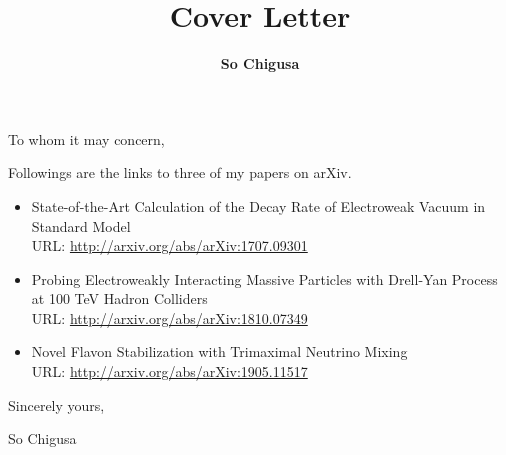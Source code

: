 \documentclass[12pt,notitlepage]{article}
\title{\vspace*{-3cm}Cover Letter}
\author{\textbf{So Chigusa}}
\date{}
\begin{document}
\thispagestyle{empty}

To whom it may concern,

\vspace{5mm}
Followings are the links to three of my papers on arXiv.
\begin{itemize}
  \setlength{\parskip}{1mm}
  \setlength{\itemsep}{0cm}
  \item
    State-of-the-Art Calculation of the Decay Rate of Electroweak Vacuum in Standard Model\\
    URL: \href{http://arxiv.org/abs/arXiv:1707.09301}{http://arxiv.org/abs/arXiv:1707.09301}

  \item
    Probing Electroweakly Interacting Massive Particles with Drell-Yan Process at 100 TeV Hadron Colliders\\
    URL: \href{http://arxiv.org/abs/arXiv:1810.07349}{http://arxiv.org/abs/arXiv:1810.07349}

  \item
    Novel Flavon Stabilization with Trimaximal Neutrino Mixing\\
    URL: \href{http://arxiv.org/abs/arXiv:1905.11517}{http://arxiv.org/abs/arXiv:1905.11517}

\end{itemize}

\vspace{5mm}
Sincerely yours,

\vspace{5mm}
So Chigusa
\end{document}
